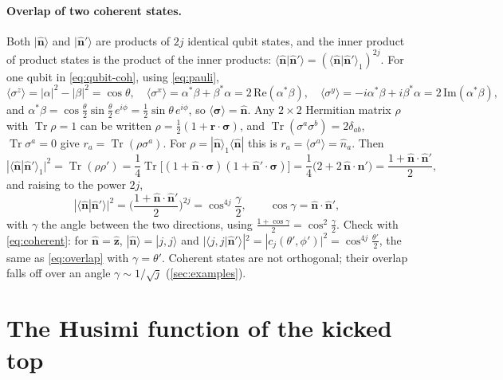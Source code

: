 \documentclass[11pt,a4paper]{article}
\newcommand{\vn}{\hat{\bm n}}
\newcommand{\Tr}{\operatorname{Tr}}
\begin{document}
\paragraph{Overlap of two coherent states.} Both $|\vn\rangle$ and $|\vn'\rangle$ are products of $2j$ identical
qubit states, and the inner product of product states is the product of the inner products:
$\langle\vn|\vn'\rangle = (\langle\vn|\vn'\rangle_1)^{2j}$. For one qubit in \eqref{eq:qubit-coh}, using
\eqref{eq:pauli},
\begin{equation*}
  \langle\sigma^z\rangle = |\alpha|^2-|\beta|^2 = \cos\theta,\quad
  \langle\sigma^x\rangle = \alpha^*\beta+\beta^*\alpha = 2\,\mathrm{Re}(\alpha^*\beta),\quad
  \langle\sigma^y\rangle = -i\alpha^*\beta + i\beta^*\alpha = 2\,\mathrm{Im}(\alpha^*\beta),
\end{equation*}
and $\alpha^*\beta = \cos\frac\theta2\sin\frac\theta2\,e^{i\phi} = \frac12\sin\theta\,e^{i\phi}$, so $\langle\bm\sigma
\rangle = \vn$. Any $2\times2$ Hermitian matrix $\rho$ with $\Tr\rho = 1$ can be written $\rho = \frac12(1 + \bm
r\cdot\bm\sigma)$, and $\Tr(\sigma^a\sigma^b) = 2\delta_{ab}$, $\Tr\sigma^a = 0$ give $r_a = \Tr(\rho\sigma^a)$. For
$\rho = |\vn\rangle_1\langle\vn|$ this is $r_a = \langle\sigma^a\rangle = \hat n_a$. Then
\begin{equation*}
  |\langle\vn|\vn'\rangle_1|^2 = \Tr(\rho\rho') = \frac14\Tr\big[(1+\vn\cdot\bm\sigma)(1+\vn'\cdot\bm\sigma)\big]
  = \frac14\big(2 + 2\,\vn\cdot\vn'\big) = \frac{1+\vn\cdot\vn'}{2},
\end{equation*}
and raising to the power $2j$,
\begin{equation}\label{eq:overlap}
  \boxed{|\langle\vn|\vn'\rangle|^2 = \Big(\frac{1+\vn\cdot\vn'}{2}\Big)^{2j} = \cos^{4j}\frac\gamma2 ,}
  \qquad \cos\gamma = \vn\cdot\vn' ,
\end{equation}
with $\gamma$ the angle between the two directions, using $\frac{1+\cos\gamma}{2} = \cos^2\frac\gamma2$. Check with
\eqref{eq:coherent}: for $\vn = \hat{\bm z}$, $|\vn\rangle = |j,j\rangle$ and $|\langle j,j|\vn'\rangle|^2 =
|c_j(\theta',\phi')|^2 = \cos^{4j}\frac{\theta'}{2}$, the same as \eqref{eq:overlap} with $\gamma = \theta'$.
Coherent states are not orthogonal; their overlap falls off over an angle $\gamma\sim1/\sqrt j$ (\cref{sec:examples}).

\section{The Husimi function of the kicked top}\label{sec:husimi}
\end{document}
